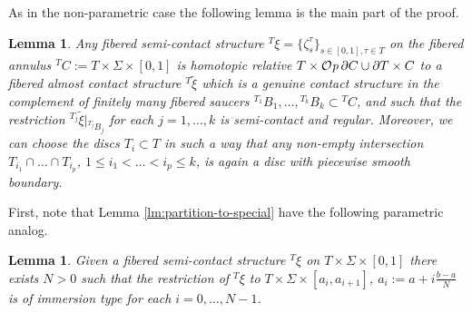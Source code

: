 \documentclass[12pt]{paper}
\theoremstyle{plain}
\newtheorem{lemma}[theorem]{Lemma}
\theoremstyle{definition}
\newcommand{\wt}{\widetilde}
\newcommand{\p}{\partial}
\def\Op{{\mathcal O}{\it p}\,}
\numberwithin{figure}{section}
\begin{document}
As in the non-parametric case the following lemma is the main part of the proof.
   \begin{lemma}\label{lm:annuli-to-saucers-param} Any  fibered  semi-contact structure  ${}^T\xi=\{\zeta^\tau_s\}_{s\in[0,1],\tau\in T}$  on the fibered annulus 
    ${}^TC:=T\times \Sigma\times[0,1]$ is homotopic relative $T\times \Op\p C\cup\p T\times C$ to a fibered almost contact structure ${}^T\wt \xi$ which is a genuine contact structure in the complement of   finitely many  fibered saucers ${}^{T_1}B_1,\dots, {}^{T_k}B_k\subset {}^TC$, and such that
    the restriction ${}^{T_j}\wt\xi|_{{}^{T_j}B_j}$ for each  $j=1,\dots, k$ 
     is semi-contact and regular.
     Moreover, we can choose the discs $T_i\subset T$ in such a way that any non-empty intersection $T_{i_1}\cap\dots\cap T_{i_p}$, $1\leq i_1<\dots<i_p\leq k$, is again a disc with piecewise smooth boundary.

    \end{lemma}
     First, note that 
  Lemma \ref{lm:partition-to-special}   
  have the following parametric analog.
  

       \begin{lemma}\label{lm:partition-to-special-param}
 Given a  fibered semi-contact structure ${}^T\!\xi$ on $T\times\Sigma\times[0,1]$ there exists $N>0$ such that the restriction  of 
 ${}^T\xi$  to $ T\times \Sigma\times[a_i,a_{i+1}]$, $a_i:=a+i\frac{b-a}N$ is of immersion type for each $i=0,\dots, N-1$.
 \end{lemma}
 
\end{document}

